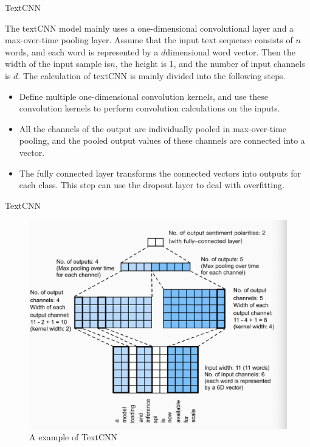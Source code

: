 \documentclass[
 size=14pt,
 paper=smartboard,  %
 mode=present, 		%
 display=slides, 	%
 style=tuliplab,  	%
 pauseslide,
 fleqn,leqno]{powerdot}
\begin{document}
\begin{slide}{TextCNN}
	
The textCNN model mainly uses 
a one-dimensional convolutional layer and 
a max-over-time pooling layer. 
Assume that 
the input text sequence consists of $ n $ words, 
and each word is represented by 
a $ d  $dimensional word vector. 
Then the width of the input sample is$  n $, 
the height is 1, 
and the number of input channels is $ d $. 
The calculation of textCNN is mainly divided into the following steps.

\begin{itemize}
	\item 
	Define multiple one-dimensional convolution kernels, 
	and use these convolution kernels to 
	perform convolution calculations on the inputs. 
	\item 
	All the channels of the output are individually pooled 
	in max-over-time pooling, 
	and the pooled output values of 
	these channels are connected into a vector.
	\item 
	The fully connected layer transforms 
	the connected vectors into outputs for each class. 
	This step can use the dropout layer to deal with overfitting.
\end{itemize}

\end{slide}

\begin{slide}[toc=,bm=]{TextCNN}

\begin{figure}
	\includegraphics[width=.7\linewidth]{figures/textCNN_en.eps}
	\caption{A example of TextCNN}
\end{figure}
	

\end{slide}
\end{document}
